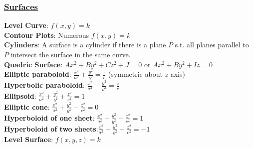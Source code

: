 \documentclass{article}
\begin{document}
\begin{multicols*}{3}
\subsubsection*{\underline{Surfaces}}
\textbf{Level Curve}: $f(x,y)=k$\\
\textbf{Contour Plots}: Numerous $f(x,y)=k$\\
\textbf{Cylinders}: A surface is a cylinder if there is a plane $P$ s.t. all planes parallel to $P$ intersect the surface in the same curve. \\
\textbf{Quadric Surface}: $Ax^2+By^2+Cz^2+J=0$ or $Ax^2+By^2+Iz=0$\\
\textbf{Elliptic paraboloid}: $\frac{x^2}{a^2}+\frac{y^2}{b^2}=\frac{z}{c}$ (symmetric about $z$-axis)\\
\textbf{Hyperbolic paraboloid}: $\frac{x^2}{a^2}-\frac{y^2}{b^2}=\frac{z}{c}$\\
\textbf{Ellipsoid}: $\frac{x^2}{a^2}+\frac{y^2}{b^2}+\frac{z^2}{c^2}=1$ \\
\textbf{Elliptic cone}: $\frac{x^2}{a^2}+\frac{y^2}{b^2}-\frac{z^2}{c^2}=0$ \\
\textbf{Hyperboloid of one sheet}:  $\frac{x^2}{a^2}+\frac{y^2}{b^2}-\frac{z^2}{c^2}=1$ \\
\textbf{Hyperboloid of two sheets}:$\frac{x^2}{a^2}+\frac{y^2}{b^2}-\frac{z^2}{c^2}=-1$  \\
\textbf{Level Surface}: $f(x,y,z)=k$

\end{multicols*}
\end{document}
